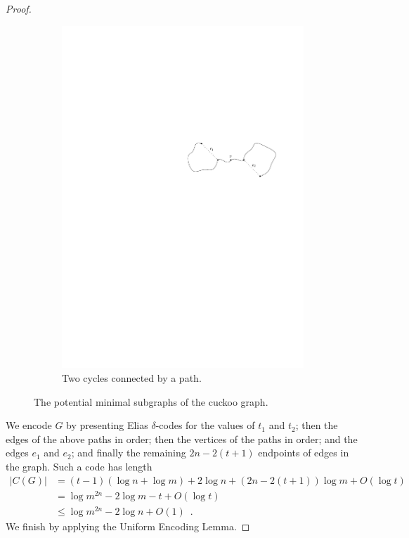 \documentclass{patmorin}
\begin{document}
\begin{proof}
\begin{figure}
\begin{subfigure}[b]{0.6\textwidth}
      \includegraphics{cuckoo2}
      \caption{Two cycles connected by a path.}
    \end{subfigure}
    \caption{The potential minimal subgraphs of the cuckoo graph.}
  \end{figure}

  We encode $G$ by presenting Elias $\delta$-codes for the values of
  $t_1$ and $t_2$; then the edges of the above paths in order; then
  the vertices of the paths in order; and the edges $e_1$ and $e_2$;
  and finally the remaining $2n - 2(t + 1)$ endpoints of edges in the
  graph. Such a code has length
  \begin{align*}
    |C(G)| &= (t - 1)(\log n + \log m) + 2\log n + (2n - 2(t + 1))\log m + O(\log t) \\
           &= \log m^{2n} - 2\log m - t + O(\log t) \\
           &\leq \log m^{2n} - 2\log n + O(1) \enspace .
  \end{align*}
  We finish by applying the Uniform Encoding Lemma.
\end{proof}
\end{document}
